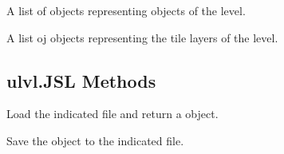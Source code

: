 \documentclass[letterpaper,10pt,english]{sphinxmanual}
\begin{document}
\begin{fulllineitems}
\begin{fulllineitems}
\end{fulllineitems}


\begin{fulllineitems}
\label{\detokenize{index:ulvl.JSL.objects}}
A list of {\hyperref[\detokenize{index:ulvl.LevelObject}]{}} objects representing objects of
the level.

\end{fulllineitems}


\begin{fulllineitems}
\label{\detokenize{index:ulvl.JSL.layers}}
A list oj {\hyperref[\detokenize{index:ulvl.TileLayer}]{}} objects representing the tile layers
of the level.

\end{fulllineitems}


\end{fulllineitems}



\subsection{ulvl.JSL Methods}
\label{\detokenize{index:ulvl-jsl-methods}}

\begin{fulllineitems}
\label{\detokenize{index:ulvl.JSL.load}}
Load the indicated file and return a {\hyperref[\detokenize{index:ulvl.JSL}]{}} object.

\end{fulllineitems}


\begin{fulllineitems}
\label{\detokenize{index:ulvl.JSL.save}}
Save the object to the indicated file.

\end{fulllineitems}
\end{document}
